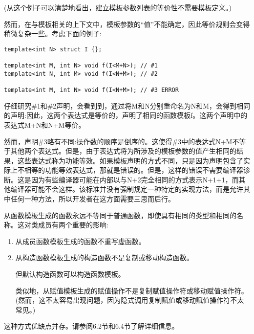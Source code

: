 (从这个例子可以清楚地看出，建立模板参数列表的等价性不需要模板定义。)

然而，在与模板相关的上下文中，模板参数的“值”不能确定，因此等价规则会变得稍微复杂一些。考虑下面的例子:

\begin{lstlisting}[style=styleCXX]
template<int N> struct I {};

template<int M, int N> void f(I<M+N>); // #1
template<int N, int M> void f(I<N+M>); // #2

template<int M, int N> void f(I<N+M>); // #3 ERROR
\end{lstlisting}

仔细研究\#1和\#2声明，会看到到，通过将M和N分别重命名为N和M，会得到相同的声明:因此，这两个表达式是等价的，声明了相同的函数模板f。这两个声明中的表达式M+N和N+M等价。

然而，声明\#3略有不同:操作数的顺序是倒序的。这使得\#3中的表达式N+M不等于其他两个表达式。但是，由于表达式将为所涉及的模板参数的值产生相同的结果，这些表达式称为功能等效。如果模板声明的方式不同，只是因为声明包含了实际上不相等的功能等效表达式，那就是错误的。但是，这样的错误不需要编译器诊断。这是因为有些编译器可能在内部以与N+2完全相同的方式表示N+1+1，而其他编译器可能不会这样。该标准并没有强制规定一种特定的实现方法，而是允许其中任何一种方法，所以开发者在这方面需要三思而后行。

从函数模板生成的函数永远不等同于普通函数，即使具有相同的类型和相同的名称。这对类成员有两个重要的影响:

\begin{enumerate}
\item
从成员函数模板生成的函数不重写虚函数。

\item
从构造函数模板生成的构造函数不是复制或移动构造函数。

\begin{tcolorbox}[colback=webgreen!5!white,colframe=webgreen!75!black]
\hspace*{0.75cm}但默认构造函数可以构造函数模板。
\end{tcolorbox}

类似地，从赋值模板生成的赋值操作不是复制赋值操作符或移动赋值操作符。(然而，这不太容易出现问题，因为隐式调用复制赋值或移动赋值操作符不太常见。)
\end{enumerate}

这种方式优缺点并存。请参阅6.2节和6.4节了解详细信息。











